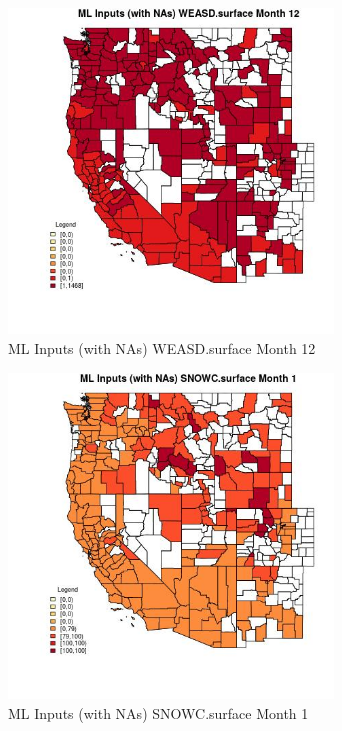 \begin{figure} 
\centering  
\includegraphics[width=0.77\textwidth]{Code_Outputs/Report_ML_input_PM25_Step4_part_f_de_duplicated_aves_prioritize_24hr_obswNAs_CountyWEASDsurfacemedianMonth12.jpg} 
\caption{\label{fig:Report_ML_input_PM25_Step4_part_f_de_duplicated_aves_prioritize_24hr_obswNAsCountyWEASDsurfacemedianMonth12}ML Inputs (with NAs) WEASD.surface Month 12} 
\end{figure} 
 

\begin{figure} 
\centering  
\includegraphics[width=0.77\textwidth]{Code_Outputs/Report_ML_input_PM25_Step4_part_f_de_duplicated_aves_prioritize_24hr_obswNAs_CountySNOWCsurfacemedianMonth1.jpg} 
\caption{\label{fig:Report_ML_input_PM25_Step4_part_f_de_duplicated_aves_prioritize_24hr_obswNAsCountySNOWCsurfacemedianMonth1}ML Inputs (with NAs) SNOWC.surface Month 1} 
\end{figure} 
 

